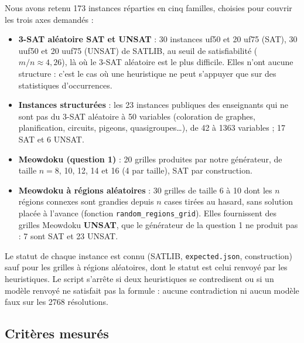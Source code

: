 \documentclass[11pt,a4paper]{article}
\begin{document}
Nous avons retenu 173 instances réparties en cinq familles, choisies pour
couvrir les trois axes demandés :
\begin{itemize}
  \item \textbf{3-SAT aléatoire SAT et UNSAT} : 30 instances uf50 et 20 uf75
    (SAT), 30 uuf50 et 20 uuf75 (UNSAT) de SATLIB, au seuil de
    satisfiabilité ($m/n \approx 4{,}26$), là où le 3-SAT aléatoire est le
    plus difficile. Elles n'ont aucune structure : c'est le cas où une
    heuristique ne peut s'appuyer que sur des statistiques d'occurrences.
  \item \textbf{Instances structurées} : les 23 instances publiques des
    enseignants qui ne sont pas du 3-SAT aléatoire à 50 variables
    (coloration de graphes, planification, circuits, pigeons,
    quasigroupes\dots), de 42 à 1363 variables ; 17 SAT et 6 UNSAT.
  \item \textbf{Meowdoku (question 1)} : 20 grilles produites par notre
    générateur, de taille $n = 8$, 10, 12, 14 et 16 (4 par taille), SAT
    par construction.
  \item \textbf{Meowdoku à régions aléatoires} : 30 grilles de taille 6 à
    10 dont les $n$ régions connexes sont grandies depuis $n$ cases tirées
    au hasard, sans solution placée à l'avance (fonction
    \texttt{random\_regions\_grid}).
    Elles fournissent des grilles Meowdoku \textbf{UNSAT}, que le générateur
    de la question 1 ne produit pas : 7 sont SAT et 23 UNSAT.
\end{itemize}
Le statut de chaque instance est connu (SATLIB, \texttt{expected.json},
construction) sauf pour les grilles à régions aléatoires, dont le statut est
celui renvoyé par les heuristiques. Le script s'arrête si deux heuristiques
se contredisent ou si un modèle renvoyé ne satisfait pas la formule :
aucune contradiction ni aucun modèle faux sur les 2768 résolutions.

\subsection{Critères mesurés}
\end{document}

